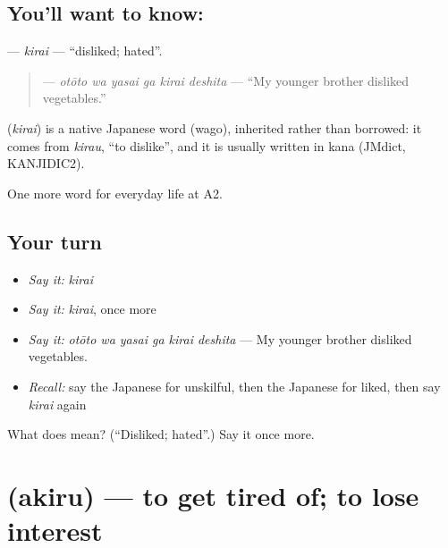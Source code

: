 \subsection*{You'll want to know: }
\textbf{} — \emph{kirai} — \textquotedblleft{}disliked; hated\textquotedblright{}.

\begin{quote}
\textbf{  } — \emph{otōto wa yasai ga kirai deshita} — \textquotedblleft{}My younger brother disliked vegetables.\textquotedblright{}
\end{quote}

\begin{cousinweb}
\textbf{} (\emph{kirai}) is a native Japanese word (wago), inherited rather than borrowed: it comes from \emph{kirau}, \textquotedblleft{}to dislike\textquotedblright{}, and it is usually written in kana (JMdict, KANJIDIC2).
\end{cousinweb}

\begin{grammarlens}[title={What you've built}]
One more word for everyday life at A2.
\end{grammarlens}

\subsection*{Your turn}
\begin{itemize}
\raggedright
  \item \emph{Say it:} \emph{kirai}
  \item \emph{Say it:} \emph{kirai}, once more
  \item \emph{Say it:} \emph{otōto wa yasai ga kirai deshita} — My younger brother disliked vegetables.
  \item \emph{Recall:} say the Japanese for unskilful, then the Japanese for liked, then say \emph{kirai} again
\end{itemize}

\begin{tcolorbox}[breakable,colback=teal!4,colframe=teal!35!black,title={Before you move on}]
What does  mean? (\textquotedblleft{}Disliked; hated\textquotedblright{}.) Say it once more.
\end{tcolorbox}
\section[\texorpdfstring{\ja{あきる} (akiru)}{あきる (akiru)}]{ (akiru) — to get tired of; to lose interest}

